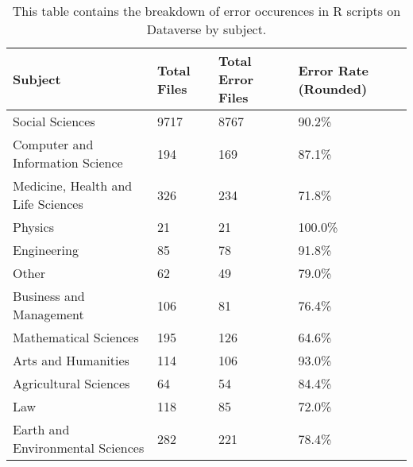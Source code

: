 \begin{table}
\centering
\caption{This table contains the breakdown of error occurences in R scripts on Dataverse by subject.}
\label{tab:subject-breakdown}
\begin{tabular}{llll}
\toprule
                           Subject & Total Files & Total Error Files & Error Rate (Rounded) \\
\midrule
                   Social Sciences &        9717 &              8767 &                90.2\% \\ \hline
  Computer and Information Science &         194 &               169 &                87.1\% \\ \hline
Medicine, Health and Life Sciences &         326 &               234 &                71.8\% \\ \hline
                           Physics &          21 &                21 &               100.0\% \\ \hline
                       Engineering &          85 &                78 &                91.8\% \\ \hline
                             Other &          62 &                49 &                79.0\% \\ \hline
           Business and Management &         106 &                81 &                76.4\% \\ \hline
             Mathematical Sciences &         195 &               126 &                64.6\% \\ \hline
               Arts and Humanities &         114 &               106 &                93.0\% \\ \hline
             Agricultural Sciences &          64 &                54 &                84.4\% \\ \hline
                               Law &         118 &                85 &                72.0\% \\ \hline
  Earth and Environmental Sciences &         282 &               221 &                78.4\% \\
\bottomrule
\end{tabular}
\end{table}
